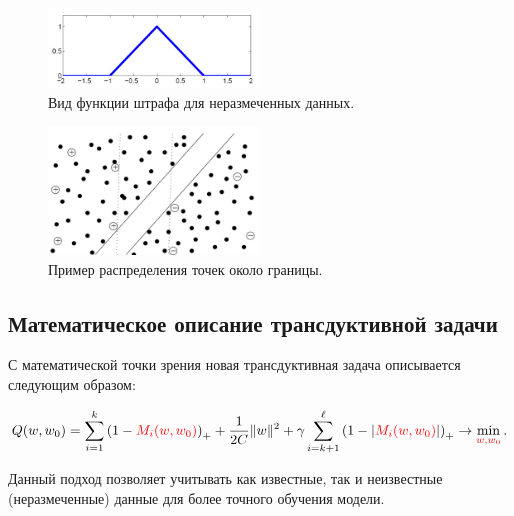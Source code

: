 \begin{figure}[ht]
    \centering
    \includegraphics[width=0.5\textwidth]{chapters/clustering/images/TSVMLoss.jpg}
    \caption{Вид функции штрафа для неразмеченных данных.}
\end{figure}

\begin{figure}[ht]
    \centering
    \includegraphics[width=0.5\textwidth]{chapters/clustering/images/ClassifierData.jpg}
    \caption{Пример распределения точек около границы.}
\end{figure}

\subsection{Математическое описание трансдуктивной задачи}
С математической точки зрения новая трансдуктивная задача описывается следующим образом:

\begin{equation}
    Q(w, w_0) = \sum_{i=1}^{k} \left( 1 - \textcolor{red}{M_i(w, w_0)} \right)_+ + \frac{1}{2C} \|w\|^2 + \gamma \sum_{i=k+1}^{\ell} \left( 1 - |\textcolor{red}{M_i(w, w_0)}| \right)_+ \to \min_{\textcolor{red}{w, w_0}}.
\end{equation}

Данный подход позволяет учитывать как известные, так и неизвестные (неразмеченные) данные для более точного обучения модели.

